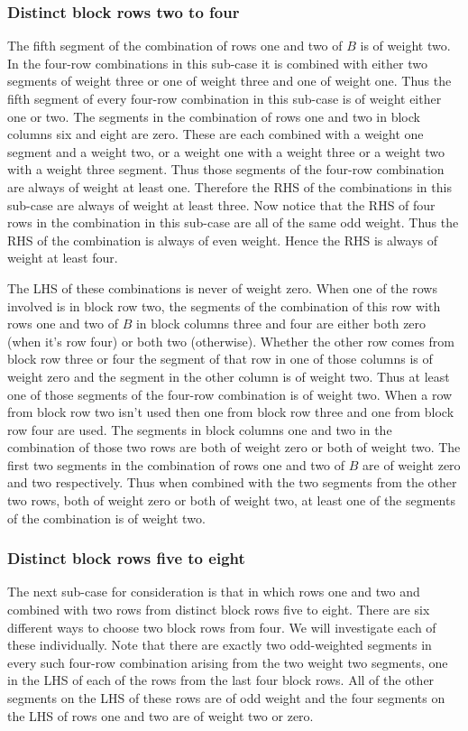 \subsubsection{Distinct block rows two to four}
The fifth segment of the combination of rows one and two of $B$ is of weight two.
In the four-row combinations in this sub-case it is combined with either two segments of weight three or one of weight three and one of weight one.
Thus the fifth segment of every four-row combination in this sub-case is of weight either one or two.
The segments in the combination of rows one and two in block columns six and eight are zero.
These are each combined with a weight one segment and a weight two, or a weight one with a weight three or a weight two with a weight three segment.
Thus those segments of the four-row combination are always of weight at least one.
Therefore the RHS of the combinations in this sub-case are always of weight at least three.
Now notice that the RHS of four rows in the combination in this sub-case are all of the same odd weight.
Thus the RHS of the combination is always of even weight.
Hence the RHS is always of weight at least four.

The LHS of these combinations is never of weight zero.
When one of the rows involved is in block row two, the segments of the combination of this row with rows one and two of $B$ in block columns three and four are either both zero (when it's row four) or both two (otherwise).
Whether the other row comes from block row three or four the segment of that row in one of those columns is of weight zero and the segment in the other column is of weight two.
Thus at least one of those segments of the four-row combination is of weight two.
When a row from block row two isn't used then one from block row three and one from block row four are used.
The segments in block columns one and two in the combination of those two rows are both of weight zero or both of weight two.
The first two segments in the combination of rows one and two of $B$ are of weight zero and two respectively.
Thus when combined with the two segments from the other two rows, both of weight zero or both of weight two, at least one of the segments of the combination is of weight two.

\subsubsection{Distinct block rows five to eight}
The next sub-case for consideration is that in which rows one and two and combined with two rows from distinct block rows five to eight.
There are six different ways to choose two block rows from four.
We will investigate each of these individually.
Note that there are exactly two odd-weighted segments in every such four-row combination arising from the two weight two segments, one in the LHS of each of the rows from the last four block rows.
All of the other segments on the LHS of these rows are of odd weight and the four segments on the LHS of rows one and two are of weight two or zero.

